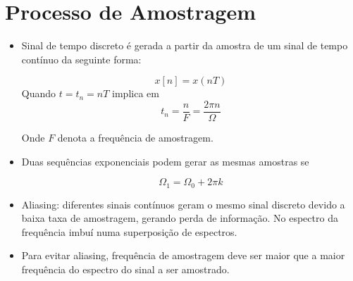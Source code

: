 \section{Processo de Amostragem}
\begin{itemize}
    \item Sinal de tempo discreto é gerada a partir da amostra de um sinal de tempo contínuo da seguinte forma:
    
    \[x[n] = x(nT)\]
    Quando $t = t_{n} = nT$ implica em
    \[t_{n} = \dfrac{n}{F} = \dfrac{2\pi n}{\Omega}\]

    Onde $F$ denota a frequência de amostragem.

    \item Duas sequências exponenciais podem gerar as mesmas amostras se 
    
    \[\Omega_{1} = \Omega_{0} + 2\pi k\]

    \item Aliasing: diferentes sinais contínuos geram o mesmo sinal discreto devido a baixa taxa de amostragem, gerando perda de informação. No espectro da frequência imbuí numa superposição de espectros.
    \item Para evitar aliasing, frequência de amostragem deve ser maior que a maior frequência do espectro do sinal a ser amostrado.
\end{itemize}